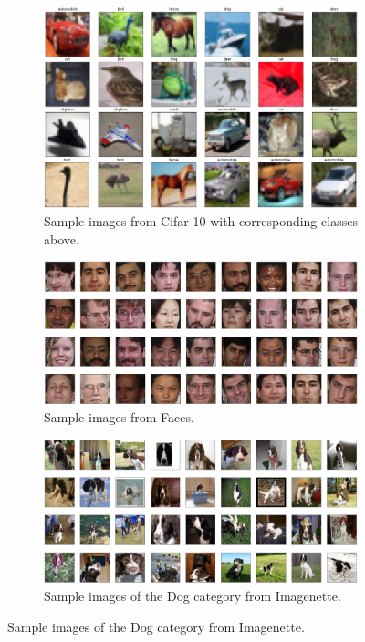 \documentclass{l4proj}
\begin{document}
\begin{figure}
    \centering
    \begin{subfigure}[b]{1.0\textwidth}
        \includegraphics[width=\textwidth]{images/cifar10.PNG}
        \caption{Sample images from Cifar-10 with corresponding classes above.}
        \label{fig:cifar10}
        \vspace*{5mm}
    \end{subfigure}
    \begin{subfigure}[b]{1.0\textwidth}
        \includegraphics[width=\textwidth]{images/celeb_faces.PNG}
        \caption{Sample images from Faces.}
        \label{fig:celebfaces}
        \vspace*{5mm}
    \end{subfigure}
    \begin{subfigure}[b]{1.0\textwidth}
        \includegraphics[width=\textwidth]{images/imagenette.PNG}
        \caption{Sample images of the Dog category from Imagenette.}
        \label{fig:imagenette}
    \end{subfigure}
    \label{fig:datasets}
\end{figure}
\end{document}
